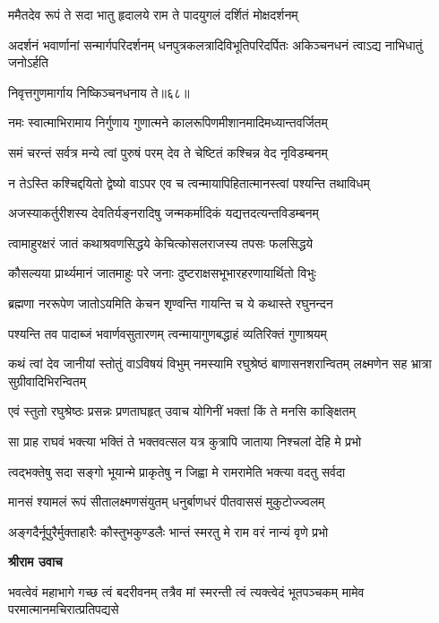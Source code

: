 \twolineshloka
{ममैतदेव रूपं ते सदा भातु हृदालये}
{राम ते पादयुगलं दर्शितं मोक्षदर्शनम्} %

\threelineshloka
{अदर्शनं भवार्णानां सन्मार्गपरिदर्शनम्}
{धनपुत्रकलत्रादिविभूतिपरिदर्पितः}
{अकिञ्चनधनं त्वाऽद्य नाभिधातुं जनोऽर्हति} %

{निवृत्तगुणमार्गाय निष्किञ्चनधनाय ते॥६८॥} %


\twolineshloka
{नमः स्वात्माभिरामाय निर्गुणाय गुणात्मने}
{कालरूपिणमीशानमादिमध्यान्तवर्जितम्} %

\twolineshloka
{समं चरन्तं सर्वत्र मन्ये त्वां पुरुषं परम्}
{देव ते चेष्टितं कश्चिन्न वेद नृविडम्बनम्} %

\twolineshloka
{न तेऽस्ति कश्चिद्दयितो द्वेष्यो वाऽपर एव च}
{त्वन्मायापिहितात्मानस्त्वां पश्यन्ति तथाविधम्} %

\twolineshloka
{अजस्याकर्तुरीशस्य देवतिर्यङ्नरादिषु}
{जन्मकर्मादिकं यद्यत्तदत्यन्तविडम्बनम्} %

\twolineshloka
{त्वामाहुरक्षरं जातं कथाश्रवणसिद्धये}
{केचित्कोसलराजस्य तपसः फलसिद्धये} %

\twolineshloka
{कौसल्यया प्रार्थ्यमानं जातमाहुः परे जनाः}
{दुष्टराक्षसभूभारहरणायार्थितो विभुः} %

\twolineshloka
{ब्रह्मणा नररूपेण जातोऽयमिति केचन}
{शृण्वन्ति गायन्ति च ये कथास्ते रघुनन्दन} %

\twolineshloka
{पश्यन्ति तव पादाब्जं भवार्णवसुतारणम्}
{त्वन्मायागुणबद्धाहं व्यतिरिक्तं गुणाश्रयम्} %

\threelineshloka
{कथं त्वां देव जानीयां स्तोतुं वाऽविषयं विभुम्}
{नमस्यामि रघुश्रेष्ठं बाणासनशरान्वितम्}
{लक्ष्मणेन सह भ्रात्रा सुग्रीवादिभिरन्वितम्} %

\twolineshloka
{एवं स्तुतो रघुश्रेष्ठः प्रसन्नः प्रणताघहृत्}
{उवाच योगिनीं भक्तां किं ते मनसि काङ्क्षितम्} %

\twolineshloka
{सा प्राह राघवं भक्त्या भक्तिं ते भक्तवत्सल}
{यत्र कुत्रापि जाताया निश्चलां देहि मे प्रभो} %

\twolineshloka
{त्वद्भक्तेषु सदा सङ्गो भूयान्मे प्राकृतेषु न}
{जिह्वा मे रामरामेति भक्त्या वदतु सर्वदा} %

\twolineshloka
{मानसं श्यामलं रूपं सीतालक्ष्मणसंयुतम्}
{धनुर्बाणधरं पीतवाससं मुकुटोज्ज्वलम्} %

\twolineshloka
{अङ्गदैर्नूपुरैर्मुक्ताहारैः कौस्तुभकुण्डलैः}
{भान्तं स्मरतु मे राम वरं नान्यं वृणे प्रभो} %

\textbf{श्रीराम उवाच}

\threelineshloka
{भवत्वेवं महाभागे गच्छ त्वं बदरीवनम्}
{तत्रैव मां स्मरन्ती त्वं त्यक्त्वेदं भूतपञ्चकम्}
{मामेव परमात्मानमचिरात्प्रतिपद्यसे} %

